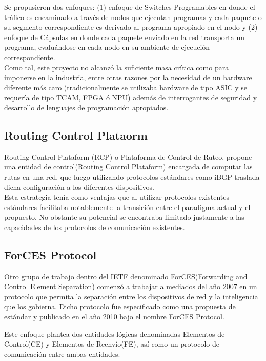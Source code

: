 Se propusieron dos enfoques: (1) enfoque de Switches Programables en donde el tr\'afico es encaminado a través de nodos que ejecutan programas y cada paquete o su segmento correspondiente es derivado al programa apropiado en el nodo y (2) enfoque de C\'apsulas en donde cada paquete enviado en la red transporta un programa, evaluándose en cada nodo en su ambiente de ejecución correspondiente.\\

Como tal, este proyecto no alcanz\'o la suficiente masa cr\'itica como para imponerse en la industria, entre otras razones por la necesidad de un hardware diferente m\'as caro (tradicionalmente se utilizaba hardware de tipo ASIC y se requería de tipo TCAM, FPGA \'o NPU) adem\'as de interrogantes de seguridad y desarrollo de lenguajes de programación apropiados.

\subsection{Routing Control Plataorm}
Routing Control Plataform (RCP)\citep{feamster2004case}\citep{caesar2005design} o Plataforma de Control de Ruteo, propone una entidad de control(Routing Control Plataform) encargada de computar las rutas en una red, que luego utilizando protocolos estándares como iBGP traslada dicha configuración a los diferentes dispositivos.\\ 

Esta estrategia ten\'ia como ventajas que al utilizar protocolos existentes estándares facilitaba notablemente la transición entre el paradigma actual y el propuesto. No obstante su potencial 
se encontraba limitado justamente a las capacidades de los protocolos de comunicación existentes.

\subsection{ForCES Protocol}
Otro grupo de trabajo dentro del IETF denominado ForCES(Forwarding and Control Element Separation) comenzó a trabajar a mediados del año 2007 en un protocolo que permita la separación entre los dispositivos de red y la inteligencia que los gobierna. Dicho protocolo fue especificado como una propuesta de estándar y publicado en el año 2010 bajo el nombre ForCES Protocol\citep{doria2010forwarding}.

Este enfoque plantea dos entidades lógicas denominadas Elementos de Control(CE) y Elementos de Reenv\'io(FE), así como un protocolo de comunicación entre ambas entidades.

